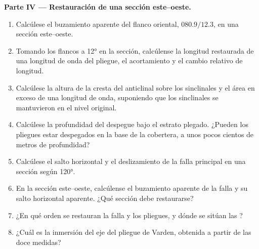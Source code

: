 \begin{problem}
\medskip\noindent\textbf{Parte IV --- Restauración de una sección este--oeste.}
\begin{enumerate}[resume]
  \item Calcúlese el buzamiento aparente del flanco oriental, $080.9/12.3$, en una
        sección este--oeste.
  \item Tomando los flancos a \ang{12} en la sección, calcúlense la longitud restaurada de una
        longitud de onda del pliegue, el acortamiento y el cambio relativo
        de longitud.
  \item Calcúlese la altura de la cresta del anticlinal sobre los sinclinales y el
        área en exceso de una longitud de onda, suponiendo que los sinclinales se mantuvieron en
        el nivel original.
  \item Calcúlese la profundidad del despegue bajo el estrato plegado. ¿Pueden
        los pliegues estar despegados en la base de la cobertera, a unos pocos cientos de metros
        de profundidad?
  \item Calcúlese el salto horizontal y el deslizamiento de la falla principal en una sección según
        \ang{120}.
  \item En la sección este--oeste, calcúlense el buzamiento aparente de la falla y
        su salto horizontal aparente. ¿Qué sección debe restaurarse?
  \item ¿En qué orden se restauran la falla y los pliegues, y dónde se sitúan las
        ?
  \item ¿Cuál es la inmersión del eje del pliegue de Varden, obtenida a partir de las doce
        medidas?
\end{enumerate}
\end{problem}
